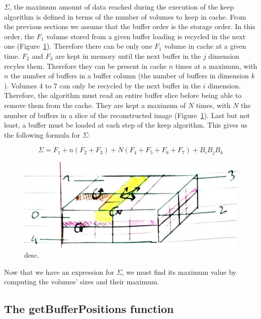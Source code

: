 \documentclass[conference]{IEEEtran}
\begin{document}
$\Sigma$, the maximum amount of data reached during the execution of the keep
algorithm is defined in terms of the number of volumes to keep in cache. From the
previous sections we assume that the buffer order is the storage order.
In this order, the $F_1$ volume stored from a given buffer loading is recycled
in the next one (Figure~\ref{fig:calculmemoire}). Therefore there can be only
one $F_1$ volume in cache at a
given time. $F_2$ and $F_3$ are kept in memory until the next
buffer in the $j$ dimension recyles them. Therefore they can be present in cache
$n$ times at a maximum, with $n$ the number of buffers in a buffer column (the
number of buffers in dimension $k$). Volumes 4 to 7 can only be recycled by the
next buffer in the $i$ dimension. Therefore, the algorithm must read an entire
buffer slice before being able to remove them from the cache. They are kept a
maximum of $N$ times, with $N$ the number of buffers in a slice of the
reconstructed image (Figure~\ref{fig:calculmemoire}).
Last but not least, a buffer must be loaded at each step of
the keep algorithm. This gives us the following formula for $\Sigma$:

\begin{equation} \label{eq:2}
\Sigma = F_1 + n(F_2 + F_3) + N(F_4 + F_5 + F_6 + F_7) + B_iB_jB_k
\end{equation}

\begin{figure}[h]
\centering
\includegraphics[scale=0.3]{./figures/new/bufferextensionalgoformula.jpeg}
\caption{desc.}
\label{fig:calculmemoire}
\end{figure}

Now that we have an expression for $\Sigma$, we must find its maximum value by
computing the volumes' sizes and their maximum.

\subsection{The getBufferPositions function}
\end{document}
